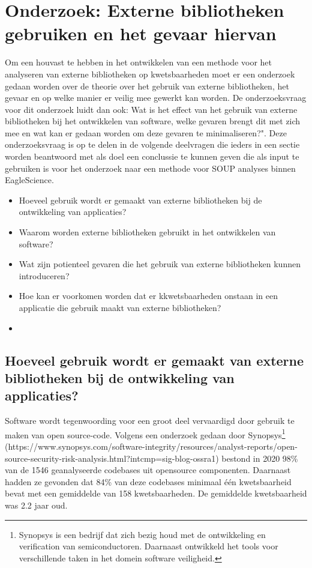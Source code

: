 \chapter{Onderzoek: Externe bibliotheken gebruiken en het gevaar hiervan}\label{ch:externeGevaren}
Om een houvast te hebben in het ontwikkelen van een methode voor het analyseren van externe bibliotheken op kwetsbaarheden moet er een onderzoek gedaan worden over de theorie over het gebruik van externe bibliotheken, het gevaar en op welke manier er veilig mee gewerkt kan worden. De onderzoeksvraag voor dit onderzoek luidt dan ook: Wat is het effect van het gebruik van externe bibliotheken bij het ontwikkelen van software, welke gevaren brengt dit met zich mee en wat kan er gedaan worden om deze gevaren te minimaliseren?". Deze onderzoeksvraag is op te delen in de volgende deelvragen die ieders in een sectie worden beantwoord met als doel een conclussie te kunnen geven die als input te gebruiken is voor het onderzoek naar een methode voor SOUP analyses binnen EagleScience.

\begin{itemize}
    \item Hoeveel gebruik wordt er gemaakt van externe bibliotheken bij de ontwikkeling van applicaties?
    \item Waarom worden externe bibliotheken gebruikt in het ontwikkelen van software?
    \item Wat zijn potienteel gevaren die het gebruik van externe bibliotheken kunnen introduceren?
    \item Hoe kan er voorkomen worden dat er kkwetsbaarheden onstaan in een applicatie die gebruik maakt van externe bibliotheken?
    \item
\end{itemize}

\section{Hoeveel gebruik wordt er gemaakt van externe bibliotheken bij de ontwikkeling van applicaties?}
Software wordt tegenwoording voor een groot deel vervaardigd door gebruik te maken van open source-code. Volgens een onderzoek gedaan door Synopsys\footnote{Synopsys is een bedrijf dat zich bezig houd met de ontwikkeling en verification van semiconductoren. Daarnaast ontwikkeld het tools voor verschillende taken in het domein software veiligheid. } (https://www.synopsys.com/software-integrity/resources/analyst-reports/open-source-security-risk-analysis.html?intcmp=sig-blog-ossra1) bestond in 2020 98\% van de 1546 geanalyseerde codebases uit opensource componenten. Daarnaast hadden ze gevonden dat 84\% van deze codebases minimaal één kwetsbaarheid bevat met een gemiddelde van 158 kwetsbaarheden. De gemiddelde kwetsbaarheid was 2.2 jaar oud.

